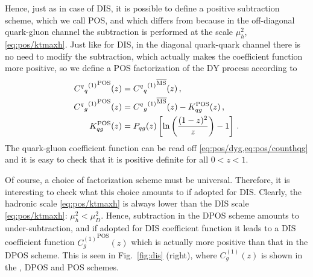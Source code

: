 Hence, just as in case of DIS, it is possible to define a positive
subtraction scheme, which we call POS, and which differs from \msbar{}
because in the off-diagonal quark-gluon channel the
subtraction is performed at the scale $\mu_h^2$,
\cref{eq:pos/ktmaxh}. Just like for DIS, in the diagonal quark-quark
channel there is no need to modify the \msbar{} subtraction, which
actually makes the coefficient function more positive, so we define 
a POS factorization of the DY process according to
\begin{align}\label{eq:pos/counthqq}
 {{C^q{}_q}^{(1)}}^{\textrm{POS}}(z) &=  {{C^q{}_q}^{(1)}}^{{\overline{\textrm{MS}}}}(z) \,, \\
 {{C^q{}_g}^{(1)}}^{\textrm{POS}}(z) &=  {{C^q{}_g}^{(1)}}^{{\overline{\textrm{MS}}}}(z) - K_{qg}^{\textrm{POS}} (z) \,,\\ \label{eq:pos/counthqg}
  K_{qg}^{\textrm{POS}} (z) &=  P_{qg}(z)\left[\ln\left(\frac{(1-z)^2}{z}\right) - 1\right] \,.
\end{align}
The quark-gluon coefficient function can be read off
\cref{eq:pos/dyg,eq:pos/counthqg} and it is easy to check that it
is positive definite for all $0<z<1$.

Of course, a choice of factorization scheme must be
universal. Therefore, it is interesting to check what this choice
amounts to if adopted for DIS. Clearly, the
hadronic scale \cref{eq:pos/ktmaxh} is always lower than the DIS
scale \cref{eq:pos/ktmaxh}: $\mu_h^2< \mu_D^2$. Hence, subtraction in the
DPOS scheme amounts to under-subtraction, and if adopted for DIS
coefficient function it leads to a DIS coefficient function
${C^{(1)}_{g}}^{\textrm{POS}}(z)$ which is actually more positive than that
in the DPOS scheme. This is seen in Fig.~\ref{fig:dis} (right), where 
${C^{(1)}_{g}}(z)$ is shown in the \msbar{}, DPOS and POS schemes.


